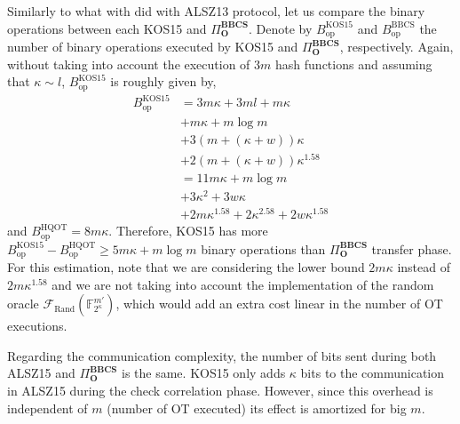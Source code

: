 Similarly to what with did with ALSZ13 protocol, let us compare the binary operations between each KOS15 and $\Pi^{\textbf{BBCS}}_{\textbf{O}}$. Denote by $B_{\text{op}}^\text{KOS15}$ and $B_{\text{op}}^\text{BBCS}$ the number of binary operations executed by KOS15 and $\Pi^{\textbf{BBCS}}_{\textbf{O}}$, respectively. Again, without taking into account the execution of $3 m$ hash functions and assuming that $\kappa \sim l$, $B_{\text{op}}^\text{KOS15}$ is roughly given by,
\begin{equation*}
\begin{split}
    B_{\text{op}}^\text{KOS15} &= 3m\kappa + 3ml + m\kappa \\
    &+ m\kappa + m \log m \\
    &+ 3(m + (\kappa + w))\kappa \\
    &+ 2(m + (\kappa + w))\kappa^{1.58}\\
    &= 11 m \kappa  + m\log m \\
    &+ 3\kappa^2 + 3w\kappa  \\
    &+ 2 m \kappa^{1.58} + 2 \kappa^{2.58} + 2w\kappa^{1.58}
\end{split}
\end{equation*}
and $B_{\text{op}}^\text{HQOT} = 8 m \kappa$. Therefore, KOS15 has more $B_{\text{op}}^\text{KOS15} - B_{\text{op}}^\text{HQOT}  \geq 5 m\kappa + m\log m$ binary operations than $\Pi^{\textbf{BBCS}}_{\textbf{O}}$ transfer phase. 
For this estimation, note that we are considering the lower bound $2 m \kappa$ instead of $2 m \kappa^{1.58}$ and we are not taking into account the implementation of the random oracle $\mathcal{F}_{\text{Rand}}(\mathbb{F}^{m'}_{2^\kappa})$, which would add an extra cost linear in the number of OT executions.

Regarding the communication complexity, the number of bits sent during both ALSZ15 and $\Pi^{\textbf{BBCS}}_{\textbf{O}}$ is the same. KOS15 only adds $\kappa$ bits to the communication in ALSZ15 during the check correlation phase. However, since this overhead is independent of $m$ (number of OT executed) its effect is amortized for big $m$.

%
%
%
